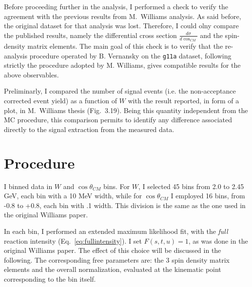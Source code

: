 \documentclass[a4paper,10pt]{report}
\begin{document}
Before proceeding further in the analysis, I performed a check to verify the agreement with the previous results from M.~Williams analysis. 
As said before, the original dataset for that analysis was lost. Therefore, I could olny compare the published results, namely the differential cross section $\frac{d\sigma}{d\cos_{CM}}$ and the spin-density matrix elements.
The main goal of this check is to verify that the re-analysis procedure operated by B. Vernansky on the \texttt{g11a} dataset, following strictly the procedure adopted by M. Williams, gives compatible results for the above observables.

Preliminarly, I compared the number of signal events (i.e. the non-acceptance corrected event yield) as a function of $W$ with the result reported, in form of a plot, in M.~Williams thesis (Fig.~3.19). Being this quantity independent from the MC procedure,
this comparison permits to identify any difference associated directly to the signal extraction from the measured data.


\section{Procedure}
I binned data in $W$ and $\cos \theta_{CM}$ bins. For $W$, I selected 45 bins from 2.0 to 2.45 GeV, each bin with a 10 MeV width, while for  $\cos \theta_{CM}$ I employed 16 bins, from -0.8 to +0.8, each bin with .1 width. This division is the 
same as the one used in the original Williams paper. 

In each bin, I performed an extended maximum likelihood fit, with the \textit{full} reaction intensity (Eq.~\ref{eq:fullintensity}). I set $F(s,t,u)=1$, as was done in the original Williams paper. The effect of this choice will be discussed in the following.
The corresponding free parameters are: the 3 spin density matrix elements and the overall normalization, evaluated at the kinematic point corresponding to the bin itself.
\end{document}
